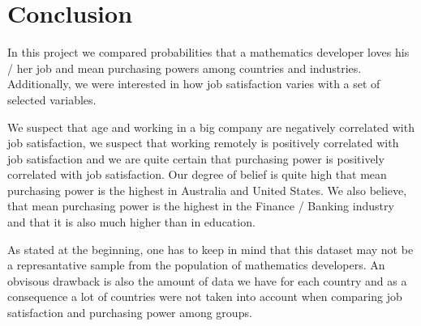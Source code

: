 \documentclass{article}
\begin{document}
\section{Conclusion}
In this project we compared probabilities that a mathematics developer loves his / her job and mean purchasing powers among countries and industries. Additionally, we were interested in how job satisfaction varies with a set of selected variables.

We suspect that age and working in a big company are negatively correlated with job satisfaction, we suspect that working remotely is positively correlated with job satisfaction and we are quite certain that purchasing power is positively correlated with job satisfaction. Our degree of belief is quite high that mean purchasing power is the highest in Australia and United States. We also believe, that mean purchasing power is the highest in the Finance / Banking industry and that it is also much higher than in education.

As stated at the beginning, one has to keep in mind that this dataset may not be a represantative sample from the population of mathematics developers. An obvisous drawback is also the amount of data we have for each country and as a consequence a lot of countries were not taken into account when comparing job satisfaction and purchasing power among groups.
\end{document}
